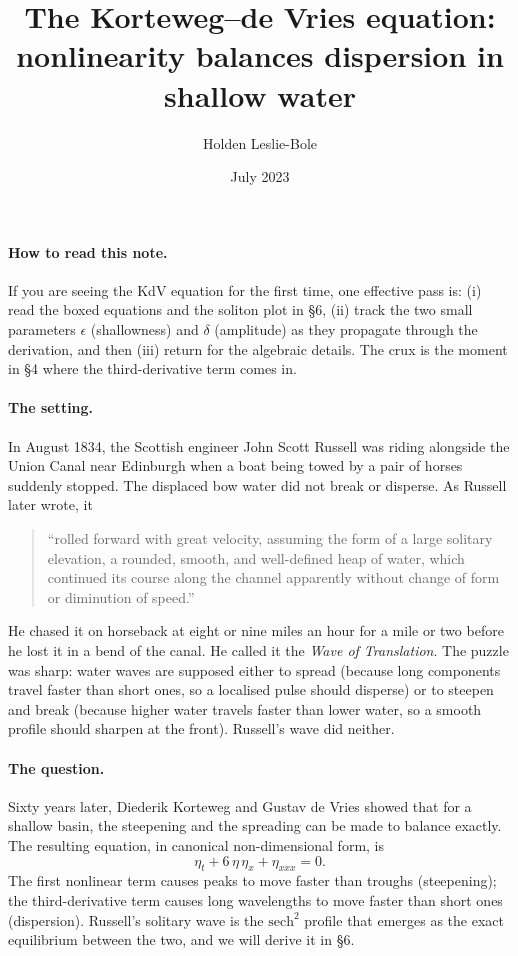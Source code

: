 \documentclass{article}
\title{The Korteweg--de Vries equation: nonlinearity balances dispersion in shallow water}
\author{Holden Leslie-Bole}
\date{July 2023}
\begin{document}
\maketitle

\paragraph{How to read this note.} If you are seeing the KdV equation for the first time, one effective pass is: (i) read the boxed equations and the soliton plot in \S 6, (ii) track the two small parameters \(\epsilon\) (shallowness) and \(\delta\) (amplitude) as they propagate through the derivation, and then (iii) return for the algebraic details. The crux is the moment in \S 4 where the third-derivative term comes in.

\paragraph{The setting.} In August 1834, the Scottish engineer John Scott Russell was riding alongside the Union Canal near Edinburgh when a boat being towed by a pair of horses suddenly stopped. The displaced bow water did not break or disperse. As Russell later wrote, it
\begin{quote}
``rolled forward with great velocity, assuming the form of a large solitary elevation, a rounded, smooth, and well-defined heap of water, which continued its course along the channel apparently without change of form or diminution of speed.''
\end{quote}
He chased it on horseback at eight or nine miles an hour for a mile or two before he lost it in a bend of the canal. He called it the \emph{Wave of Translation}. The puzzle was sharp: water waves are supposed either to spread (because long components travel faster than short ones, so a localised pulse should disperse) or to steepen and break (because higher water travels faster than lower water, so a smooth profile should sharpen at the front). Russell's wave did neither.

\paragraph{The question.} Sixty years later, Diederik Korteweg and Gustav de Vries showed that for a shallow basin, the steepening and the spreading can be made to balance exactly. The resulting equation, in canonical non-dimensional form, is
\begin{equation}
\boxed{\;\eta_t + 6\, \eta\, \eta_x + \eta_{xxx} = 0.\;}
\label{eq:kdv-canonical}
\end{equation}
The first nonlinear term causes peaks to move faster than troughs (steepening); the third-derivative term causes long wavelengths to move faster than short ones (dispersion). Russell's solitary wave is the \(\mathrm{sech}^2\) profile that emerges as the exact equilibrium between the two, and we will derive it in \S 6.
\end{document}
